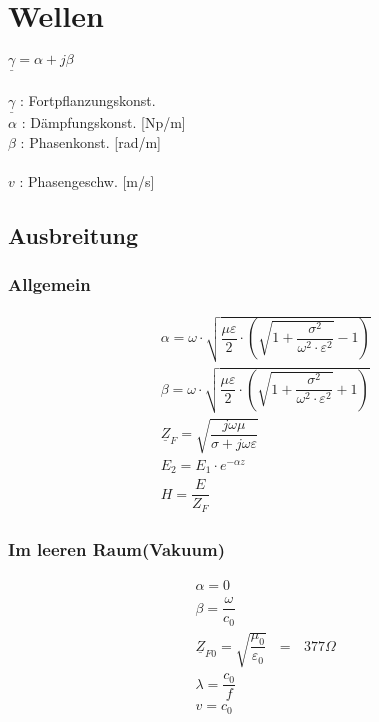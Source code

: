 \section{Wellen}
$\underline{\gamma}=\alpha+j\beta$\\\\
$\underline{\gamma}$ : Fortpflanzungskonst.\\
$\alpha$ : Dämpfungskonst. [Np/m]\\
$\beta$ : Phasenkonst. [rad/m]\\\\
$v$ : Phasengeschw. [m/s]

\subsection{Ausbreitung}
\subsubsection{Allgemein}
\begin{align*}
     & \alpha = \omega \cdot \sqrt{\dfrac{\mu \varepsilon}{2}\cdot \left(\sqrt{1+\dfrac{\sigma^2}{\omega^2\cdot\varepsilon^2}}-1\right)} \\
     & \beta  = \omega \cdot \sqrt{\dfrac{\mu \varepsilon}{2}\cdot \left(\sqrt{1+\dfrac{\sigma^2}{\omega^2\cdot\varepsilon^2}}+1\right)} \\
     & \underline{Z}_F = \sqrt{\dfrac{j\omega\mu}{\sigma+j\omega\varepsilon}}                                                            \\
     & E_2 = E_1 \cdot e^{-\alpha z}                                                                                                     \\
     & H = \dfrac{E}{Z_F}
\end{align*}

\subsubsection{Im leeren Raum(Vakuum)}
\begin{align*}
     & \alpha = 0                                                                         \\
     & \beta = \dfrac{\omega}{c_0}                                                        \\
     & \underline{Z}_{F0} = \sqrt{\dfrac{\mu_0}{\varepsilon_0}}\text{ }=\text{ }377\Omega \\
     & \lambda = \dfrac{c_0}{f}                                                           \\
     & v = c_0
\end{align*}

